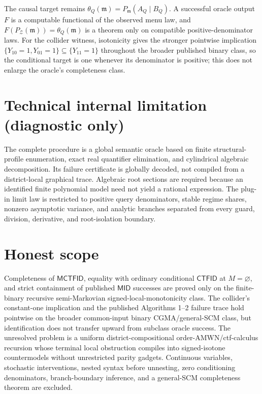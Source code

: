 \documentclass{article}
\begin{document}
The causal target remains \(\theta_Q(\mathfrak m)=P_{\mathfrak m}(A_Q\mid B_Q)\).  A successful oracle output \(F\) is a computable functional of the observed menu law, and \(F(P_{\mathcal Z}(\mathfrak m))=\theta_Q(\mathfrak m)\) is a theorem only on compatible positive-denominator laws.  For the collider witness, isotonicity gives the stronger pointwise implication \(\{Y_{10}=1,Y_{01}=1\}\subseteq\{Y_{11}=1\}\) throughout the broader published binary class, so the conditional target is one whenever its denominator is positive; this does not enlarge the oracle's completeness class.

\section*{Technical internal limitation (diagnostic only)}

The complete procedure is a global semantic oracle based on finite structural-profile enumeration, exact real quantifier elimination, and cylindrical algebraic decomposition.  Its failure certificate is globally decoded, not compiled from a district-local graphical trace.  Algebraic root sections are required because an identified finite polynomial model need not yield a rational expression.  The plug-in limit law is restricted to positive query denominators, stable regime shares, nonzero asymptotic variance, and analytic branches separated from every guard, division, derivative, and root-isolation boundary.

\section{Honest scope}

Completeness of \(\mathsf{MCTFID}\), equality with ordinary conditional \(\mathsf{CTFID}\) at \(M=\varnothing\), and strict containment of published \(\mathsf{MID}\) successes are proved only on the finite-binary recursive semi-Markovian signed-local-monotonicity class.  The collider's constant-one implication and the published Algorithms 1--2 failure trace hold pointwise on the broader common-input binary CGMA/general-SCM class, but identification does not transfer upward from subclass oracle success.  The unresolved problem is a uniform district-compositional order-AMWN/ctf-calculus recursion whose terminal local obstruction compiles into signed-isotone countermodels without unrestricted parity gadgets.  Continuous variables, stochastic interventions, nested syntax before unnesting, zero conditioning denominators, branch-boundary inference, and a general-SCM completeness theorem are excluded.
\end{document}
